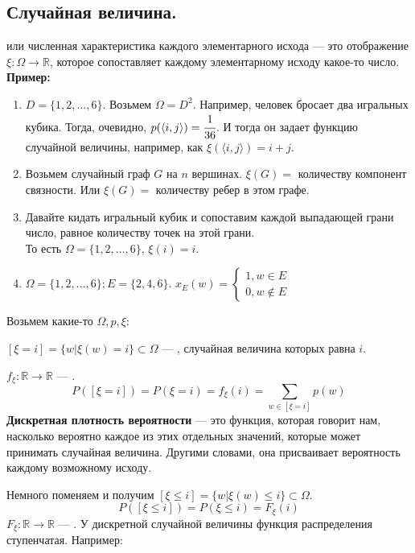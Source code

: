\subsection{Случайная величина.}
 или численная характеристика каждого элементарного исхода --- это отображение $\xi: \Omega \rightarrow \mathbb{R}$, которое сопоставляет каждому элементарному исходу какое-то число.\\
\textbf{Пример:}

\begin{enumerate}
    \item $D = \{1,2,\ldots,6\}$. Возьмем $\Omega = D^2$. Например, человек бросает два игральных кубика. Тогда, очевидно, $p(\langle i,j\rangle) = \cfrac{1}{36}$. И тогда он задает функцию случайной величины, например, как $\xi(\langle i,j \rangle) = i+j$.

    \item Возьмем случайный граф $G$ на $n$ вершинах. $\xi(G) = $ количеству компонент связности. Или  $\xi(G) = $ количеству ребер в этом графе.

    \item Давайте кидать игральный кубик и сопоставим каждой выпадающей грани число, равное количеству точек на этой грани.\\То есть $\Omega = \{1,2,\ldots,6\}$, $\xi (i) = i$. 
    \item  $\Omega =\{1,2,\ldots,6\}; E = \{2,4,6\}$. $x_E(w) = \begin{cases}
        1, w\in E\\
        0, w\notin E 
    \end{cases}$
\end{enumerate}

Возьмем какие-то $\Omega, p, \xi$:

$\left[\xi = i\right] = \{w|\xi(w)=i\}\subset \Omega$ --- , случайная величина которых равна $i$. 

 $f_{\xi}:\mathbb{R}\rightarrow \mathbb{R}$ --- .
$$P([\xi=i])=P(\xi=i) = f_{\xi}(i) =\sum\limits_{w \in [\xi=i]}p(w)$$
\textbf{Дискретная плотность вероятности} --- это функция, которая говорит нам, насколько вероятно каждое из этих отдельных значений, которые может принимать случайная величина. Другими словами, она присваивает вероятность каждому возможному исходу.

Немного поменяем и получим $\left[\xi \leq i\right] = \{w|\xi(w)\leq i\}\subset \Omega$.
$$P([\xi \leq i])=P(\xi\leq i) = F_{\xi}(i)$$
 $F_{\xi}:\mathbb{R}\rightarrow \mathbb{R}$ --- . У дискретной случайной величины функция распределения ступенчатая. Например:

